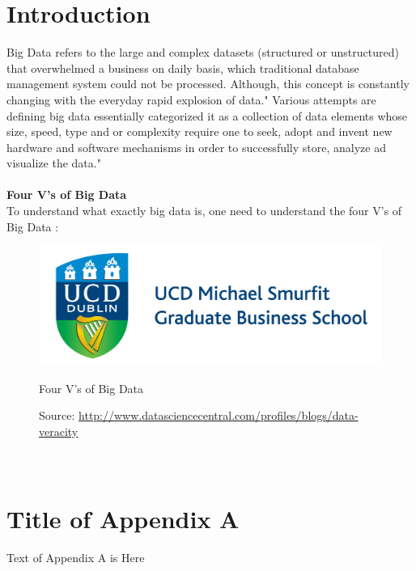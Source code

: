 \documentclass[paper=a4, fontsize=11pt]{scrartcl} %
\begin{document}
\section{Introduction}
Big Data refers to the large and complex datasets (structured or unstructured) that overwhelmed a business on daily basis, which traditional database management system could not be processed. Although, this concept is constantly changing with the everyday rapid explosion of data." Various attempts are defining big data essentially categorized it as a collection of data elements whose size, speed, type and or complexity require one to seek, adopt and invent new hardware and software mechanisms in order to successfully store, analyze ad visualize the data." \citep{belle2015big}
\\
\\
\textbf{Four V's of Big Data}
\\
To understand what exactly big data is, one need to understand the four V's of Big Data \citep{zikopoulos2012harness}:
\\
\begin{figure}[ht]
\centering
	\includegraphics[scale = 0.7]{logo.png} 
	\caption{Four V's of Big Data}
	\caption*{Source: \url{http://www.datasciencecentral.com/profiles/blogs/data-veracity}}	
\end{figure}
\appendix
\section{\\Title of Appendix A}

Text of Appendix A is Here

\end{document}
